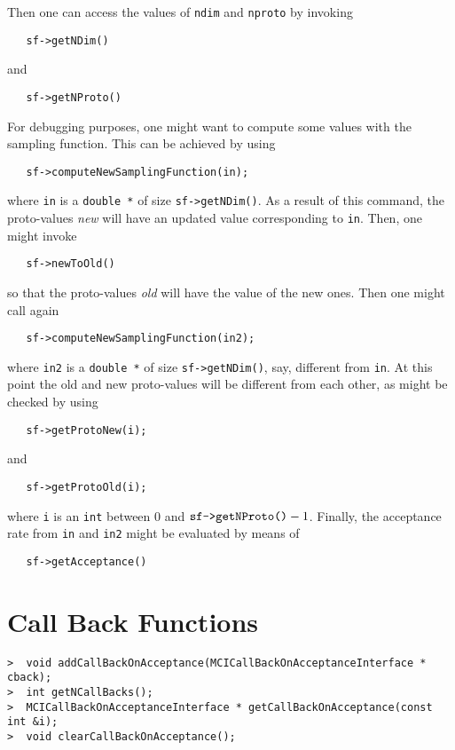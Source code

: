 \documentclass[11pt,a4paper,twoside]{article}
\begin{document}
Then one can access the values of \verb+ndim+ and \verb+nproto+ by invoking
\begin{verbatim}
   sf->getNDim()
\end{verbatim}
and
\begin{verbatim}
   sf->getNProto()
\end{verbatim}

For debugging purposes, one might want to compute some values with the sampling function.
This can be achieved by using
\begin{verbatim}
   sf->computeNewSamplingFunction(in);
\end{verbatim}
where \verb+in+ is a \verb+double *+ of size \verb+sf->getNDim()+.
As a result of this command, the proto-values \emph{new} will have an updated value corresponding to \verb+in+.
Then, one might invoke
\begin{verbatim}
   sf->newToOld()
\end{verbatim}
so that the proto-values \emph{old} will have the value of the new ones.
Then one might call again
\begin{verbatim}
   sf->computeNewSamplingFunction(in2);
\end{verbatim}
where \verb+in2+ is a \verb+double *+ of size \verb+sf->getNDim()+, say, different from \verb+in+.
At this point the old and new proto-values will be different from each other, as might be checked by using
\begin{verbatim}
   sf->getProtoNew(i);
\end{verbatim}
and
\begin{verbatim}
   sf->getProtoOld(i);
\end{verbatim}
where \verb+i+ is an \verb+int+ between $0$ and $\verb+sf->getNProto()+ - 1$.
Finally, the acceptance rate from \verb+in+ and \verb+in2+ might be evaluated by means of
\begin{verbatim}
   sf->getAcceptance()
\end{verbatim}





\section{Call Back Functions}
\label{sec:call_back_functions}
\begin{verbatim}
>  void addCallBackOnAcceptance(MCICallBackOnAcceptanceInterface * cback);
>  int getNCallBacks();
>  MCICallBackOnAcceptanceInterface * getCallBackOnAcceptance(const int &i);
>  void clearCallBackOnAcceptance();
\end{verbatim}
\end{document}
